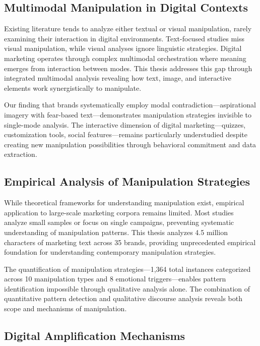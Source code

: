 \subsection{Multimodal Manipulation in Digital Contexts}

Existing literature tends to analyze either textual or visual manipulation, rarely examining their interaction in digital environments. Text-focused studies miss visual manipulation, while visual analyses ignore linguistic strategies. Digital marketing operates through complex multimodal orchestration where meaning emerges from interaction between modes. This thesis addresses this gap through integrated multimodal analysis revealing how text, image, and interactive elements work synergistically to manipulate.

Our finding that brands systematically employ modal contradiction—aspirational imagery with fear-based text—demonstrates manipulation strategies invisible to single-mode analysis. The interactive dimension of digital marketing—quizzes, customization tools, social features—remains particularly understudied despite creating new manipulation possibilities through behavioral commitment and data extraction.

\subsection{Empirical Analysis of Manipulation Strategies}

While theoretical frameworks for understanding manipulation exist, empirical application to large-scale marketing corpora remains limited. Most studies analyze small samples or focus on single campaigns, preventing systematic understanding of manipulation patterns. This thesis analyzes 4.5 million characters of marketing text across 35 brands, providing unprecedented empirical foundation for understanding contemporary manipulation strategies.

The quantification of manipulation strategies—1,364 total instances categorized across 10 manipulation types and 8 emotional triggers—enables pattern identification impossible through qualitative analysis alone. The combination of quantitative pattern detection and qualitative discourse analysis reveals both scope and mechanisms of manipulation.

\subsection{Digital Amplification Mechanisms}

